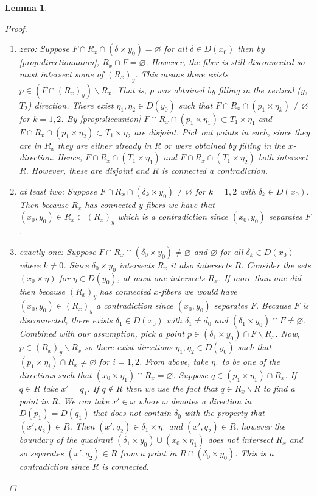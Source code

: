 \documentclass[12pt,parskip=full]{report}
\theoremstyle{plain}
\newtheorem{lem}[thm]{Lemma}
\theoremstyle{definition}
\newcommand{\rxy}{(R_x)_y}
\begin{document}
\begin{lem}
\begin{proof}
        \begin{enumerate}
            \item zero: Suppose \(F\cap R_x \cap (\delta \times y_0)=\varnothing\) for all \(\delta\in D(x_0)\) then by \ref{prop:directionunion}, $R_x \cap F=\varnothing$. However, the fiber is still disconnected so must intersect some of $\rxy$. This means there exists $p\in (F\cap \rxy)\smallsetminus R_x$. That is, $p$ was obtained by filling in the vertical ($y$, $T_2$) direction. There exist $\eta_1, \eta_2\in D(y_0)$ such that $F\cap R_x \cap (p_1 \times \eta_k) \neq \varnothing$ for $k=1,2$. By \ref{prop:sliceunion} \(F\cap R_x \cap (p_1 \times \eta_1)\subset T_1\times \eta_1\) and \(F \cap R_x \cap (p_1 \times \eta_2)\subset T_1\times \eta_2\) are disjoint. Pick out points in each, since they are in $R_x$ they are either already in $R$ or were obtained by filling in the $x$-direction. Hence, $F\cap R_x \cap (T_1\times \eta_1)$ and $F\cap R_x \cap (T_1\times \eta_2)$ both intersect $R$. However, these are disjoint and $R$ is connected a contradiction.
            \item at least two: Suppose \(F\cap R_x\cap(\delta_k \times y_0)\neq\varnothing\) for $k=1,2$ with $\delta_k\in D(x_0)$. Then because $R_x$ has connected $y$-fibers we have that $(x_0,y_0)\in R_x\subset \rxy$ which is a contradiction since $(x_0,y_0)$ separates $F$.
            \item exactly one: Suppose \(F\cap R_x\cap(\delta_0 \times y_0)\neq\varnothing\) and $\varnothing$ for all $\delta_k\in D(x_0)$ where $k\neq 0$. Since $\delta_0\times y_0$ intersects $R_x$ it also intersects $R$. Consider the sets $(x_0\times \eta)$ for $\eta\in D(y_0)$, at most one intersects $R_x$. If more than one did then because $\rxy$ has connected $x$-fibers we would have $(x_0,y_0)\in\rxy$ a contradiction since $(x_0,y_0)$ separates $F$. Because $F$ is disconnected, there exists $\delta_1\in D(x_0)$ with $\delta_1\neq d_0$ and $(\delta_1\times y_0)\cap F\neq \varnothing$. Combined with our assumption, pick a point $p\in (\delta_1\times y_0)\cap F\smallsetminus R_x$. Now, $p\in\rxy\smallsetminus R_x$ so there exist directions $\eta_1,\eta_2\in D(y_0)$ such that $(p_1\times \eta_i)\cap R_x\neq\varnothing$ for $i=1,2$. From above, take $\eta_1$ to be one of the directions such that $(x_0\times \eta_1)\cap R_x =\varnothing$. Suppose $q\in (p_1\times \eta_1)\cap R_x$. If $q\in R$ take $x'=q_1$. If $q\not\in R$ then we use the fact that $q\in R_x\smallsetminus R$ to find a point in $R$. We can take $x'\in \omega$ where $\omega$ denotes a direction in $D(p_1)=D(q_1)$ that does not contain $\delta_0$ with the property that $(x',q_2)\in R$. Then $(x', q_2)\in \delta_1\times \eta_1$ and $(x',q_2)\in R$, however the boundary of the quadrant $(\delta_1\times y_0)\cup (x_0\times \eta_1)$ does not intersect $R_x$ and so separates $(x',q_2)\in R$ from a point in $R\cap (\delta_0\times y_0)$. This is a contradiction since $R$ is connected.

\end{enumerate}
\end{proof}
\end{lem}
\end{document}
